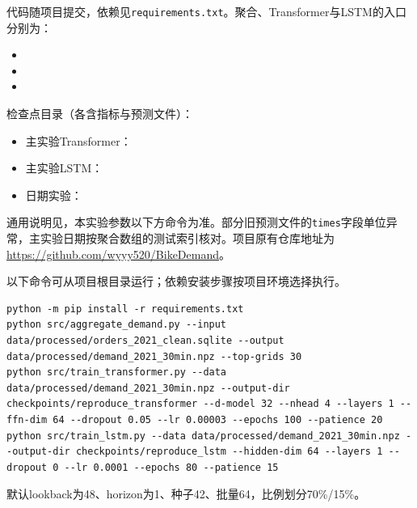 \documentclass[11pt]{ctexart}
\begin{document}
代码随项目提交，依赖见\texttt{requirements.txt}。聚合、Transformer与LSTM的入口分别为：
\begin{itemize}\small
\item {}
\item {}
\item {}
\end{itemize}
检查点目录（各含指标与预测文件）：
\begin{itemize}\small
\item 主实验Transformer：
\item 主实验LSTM：
\item 日期实验：
\end{itemize}
通用说明见，本实验参数以下方命令为准。部分旧预测文件的\texttt{times}字段单位异常，主实验日期按聚合数组的测试索引核对。项目原有仓库地址为\url{https://github.com/wyyy520/BikeDemand}。

以下命令可从项目根目录运行；依赖安装步骤按项目环境选择执行。
\begin{lstlisting}
python -m pip install -r requirements.txt
python src/aggregate_demand.py --input data/processed/orders_2021_clean.sqlite --output data/processed/demand_2021_30min.npz --top-grids 30
python src/train_transformer.py --data data/processed/demand_2021_30min.npz --output-dir checkpoints/reproduce_transformer --d-model 32 --nhead 4 --layers 1 --ffn-dim 64 --dropout 0.05 --lr 0.00003 --epochs 100 --patience 20
python src/train_lstm.py --data data/processed/demand_2021_30min.npz --output-dir checkpoints/reproduce_lstm --hidden-dim 64 --layers 1 --dropout 0 --lr 0.0001 --epochs 80 --patience 15
\end{lstlisting}
默认lookback为48、horizon为1、种子42、批量64，比例划分70\%/15\%。
\end{document}
